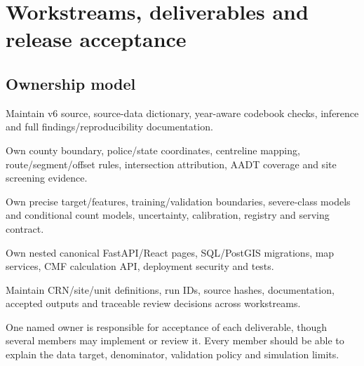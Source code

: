 \documentclass[11pt,a4paper,openany]{report}
\begin{document}
\chapter{Workstreams, deliverables and release acceptance}
\section{Ownership model}
\begin{description}[style=nextline,leftmargin=0pt,topsep=2pt,itemsep=4pt]
\item[Statistical analysis.] Maintain v6 source, source-data dictionary, year-aware codebook checks, inference and full findings/reproducibility documentation.
\item[Geospatial analysis.] Own county boundary, police/state coordinates, centreline mapping, route/segment/offset rules, intersection attribution, AADT coverage and site screening evidence.
\item[ML and evaluation.] Own precise target/features, training/validation boundaries, severe-class models and conditional count models, uncertainty, calibration, registry and serving contract.
\item[Website and integration.] Own nested canonical FastAPI/React pages, SQL/PostGIS migrations, map services, CMF calculation API, deployment security and tests.
\item[Data steward/release integrator.] Maintain CRN/site/unit definitions, run IDs, source hashes, documentation, accepted outputs and traceable review decisions across workstreams.
\end{description}
One named owner is responsible for acceptance of each deliverable, though several members may implement or review it. Every member should be able to explain the data target, denominator, validation policy and simulation limits.
\end{document}

